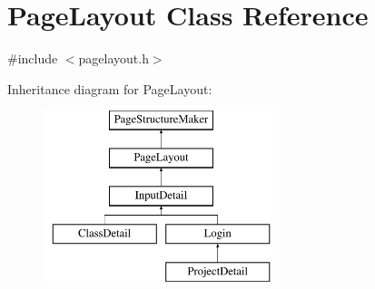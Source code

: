 \hypertarget{classPageLayout}{\section{Page\-Layout Class Reference}
\label{classPageLayout}
}


{\ttfamily \#include $<$pagelayout.\-h$>$}

Inheritance diagram for Page\-Layout\-:\begin{figure}[H]
\begin{center}
\leavevmode
\includegraphics[height=5.000000cm]{classPageLayout}
\end{center}
\end{figure}
